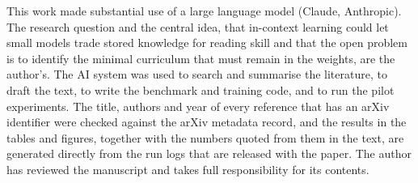 This work made substantial use of a large language model (Claude, Anthropic).
The research question and the central idea, that in-context learning could let small models trade stored knowledge for reading skill and that the open problem is to identify the minimal curriculum that must remain in the weights, are the author's.
The AI system was used to search and summarise the literature, to draft the text, to write the benchmark and training code, and to run the pilot experiments.
The title, authors and year of every reference that has an arXiv identifier were checked against the arXiv metadata record, and the results in the tables and figures, together with the numbers quoted from them in the text, are generated directly from the run logs that are released with the paper.
The author has reviewed the manuscript and takes full responsibility for its contents.
